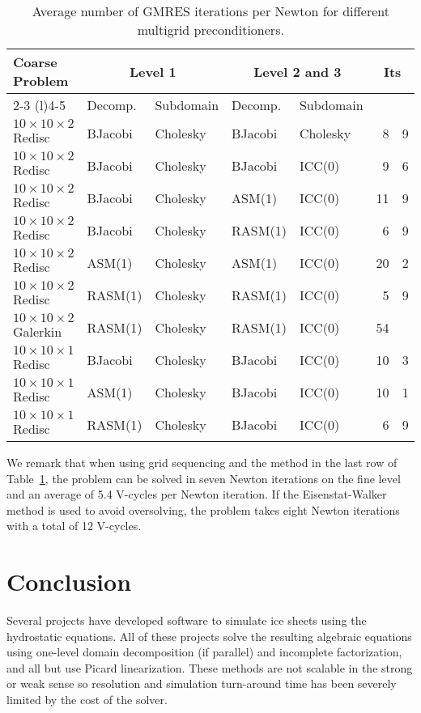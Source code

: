 \begin{table}
  \centering\caption{Average number of GMRES iterations per Newton for different multigrid preconditioners.}\label{tab:xmg}
  \begin{tabular}{l ll ll r@{.}l}
    \toprule
    \multirow{3}{*}{Coarse Problem} & \multicolumn{2}{c}{Level 1} & \multicolumn{2}{c}{Level 2 and 3} & \multicolumn{2}{c}{\multirow{3}{*}{Its}} \\
    \cmidrule(r){2-3} \cmidrule(l){4-5}
                                   & Decomp. & Subdomain & Decomp. & Subdomain         \\
    \midrule
    $10\times 10\times 2$ Redisc   & BJacobi & Cholesky & BJacobi & Cholesky & 8  & 9 \\
    $10\times 10\times 2$ Redisc   & BJacobi & Cholesky & BJacobi & ICC(0)   & 9  & 6 \\
    $10\times 10\times 2$ Redisc   & BJacobi & Cholesky & ASM(1)  & ICC(0)   & 11 & 9 \\
    $10\times 10\times 2$ Redisc   & BJacobi & Cholesky & RASM(1) & ICC(0)   & 6  & 9 \\
    $10\times 10\times 2$ Redisc   & ASM(1)  & Cholesky & ASM(1)  & ICC(0)   & 20 & 2 \\
    $10\times 10\times 2$ Redisc   & RASM(1) & Cholesky & RASM(1) & ICC(0)   & 5  & 9 \\
    $10\times 10\times 2$ Galerkin & RASM(1) & Cholesky & RASM(1) & ICC(0)   & 54 &   \\
    $10\times 10\times 1$ Redisc   & BJacobi & Cholesky & BJacobi & ICC(0)   & 10 & 3 \\
    $10\times 10\times 1$ Redisc   & ASM(1)  & Cholesky & BJacobi & ICC(0)   & 10 & 1 \\
    $10\times 10\times 1$ Redisc   & RASM(1) & Cholesky & BJacobi & ICC(0)   & 6  & 9 \\
    \bottomrule
  \end{tabular}
\end{table}

We remark that when using grid sequencing and the method in the last row of Table~\ref{tab:xmg}, the problem can be solved in seven Newton iterations on the fine level and an average of 5.4 V-cycles per Newton iteration.
If the Eisenstat-Walker method is used to avoid oversolving, the problem takes eight Newton iterations with a total of 12 V-cycles.

\section{Conclusion}
Several projects \citep{lemieux2011jfnk,issm,johnson2007modeling,desmedt2010using,pattyn2003ntd,lemieux2011jfnk} have developed software to simulate ice sheets using the hydrostatic equations.
All of these projects solve the resulting algebraic equations using one-level domain decomposition (if parallel) and incomplete factorization, and all but \citep{lemieux2011jfnk} use Picard linearization.
These methods are not scalable in the strong or weak sense so resolution and simulation turn-around time has been severely limited by the cost of the solver.

